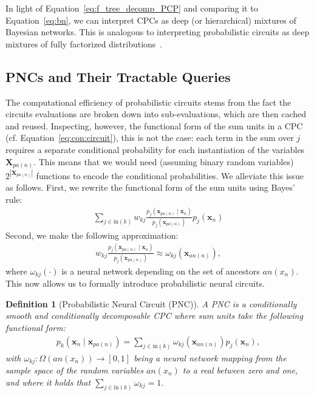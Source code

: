 \documentclass[letterpaper]{article} %
\newcommand{\cf}{cf.\xspace}
\newtheorem{definition}[theorem]{Definition}
\newcommand{\circuit}{\ensuremath{p}}
\newcommand{\inputs}{\ensuremath{\text{in}}}
\newcommand{\Xvars}{\ensuremath{\mathbf{X}}}
\newcommand{\xvars}{\ensuremath{\mathbf{x}}}
\newcommand{\xvar}{\ensuremath{x}}
\newcommand{\weight}{\ensuremath{w}}
\newcommand{\nweight}{\ensuremath{\omega}}
\newcommand{\parents}{\ensuremath{{pa}}}
\newcommand{\ancestors}{\ensuremath{{an}}}
\begin{document}
In light of Equation~\ref{eq:f_tree_decomp_PCP} and comparing it to Equation~\ref{eq:bn}, we can interpret CPCs as deep (or hierarchical) mixtures of Bayesian networks. This is analogous to interpreting probabilistic circuits as deep mixtures of fully factorized distributions~\citep{poon2011sum}.

\subsection{PNCs and Their Tractable Queries}
\label{sec:pnc}

The computational efficiency of probabilistic circuits stems from the fact the circuits evaluations are broken down into sub-evaluations, which are then cached and reused.
Inspecting, however, the functional form of the sum units in a CPC (\cf Equation~\ref{eq:con:circuit}), this is not the case:
each term in the sum over $j$ requires a separate conditional probability for each instantiation of the variables $\Xvars_{\parents(n)}$.
This means that we would need (assuming binary random variables) $2^{|\Xvars_{\parents(n)}|}$ functions to encode the conditional probabilities.
We alleviate this issue as follows. First, we rewrite the functional form of the sum units using Bayes' rule:
\begin{align}
    \sum_{j\in\inputs(k)}
    \weight_{kj}
    \frac{
        \circuit_j(  \xvars_{\parents(n)} \mid \xvars_n  )
    }{
        \circuit_j(  \xvars_{\parents(n)  })
    }
    \circuit_j(  \xvars_n)
\end{align}
Second, we make the following approximation:
\begin{align}
    \weight_{kj}
    \frac{
        \circuit_j(  \xvars_{\parents(n)} \mid \xvars_n  )
    }{
        \circuit_j(  \xvars_{\parents(n)  })
    }
    \approx
    \nweight_{kj}(\xvars_{\ancestors(n)}),
\end{align}
where $\nweight_{kj}(\cdot)$ is a neural network depending on the set of ancestors $\ancestors(\xvar_n)$. This now allows us to formally introduce probabilistic neural circuits.
\begin{definition}[Probabilistic Neural Circuit (PNC)]
    \label{def:pnc}
    A PNC is a conditionally smooth and conditionally decomposable  CPC where sum units take the following functional form:
    \begin{align}
        {\circuit}_k(\xvars_n \mid  \xvars_{\parents(n)})
        =
        \sum_{j\in\inputs(k)} \nweight_{kj} ( \xvars_{\ancestors(n)}) \circuit_j(\xvars_n),
        \label{eq:pnc}
    \end{align}
    with $\nweight_{kj}: \Omega( \ancestors(\xvar_n)) \rightarrow [0,1 ]$ being a neural network mapping from the sample space of the random variables $\ancestors(\xvar_n)$ to a real  between zero and one, and where it holds that $\sum_{j\in\inputs(k)} \nweight_{kj} = 1$.
\end{definition}
\end{document}
